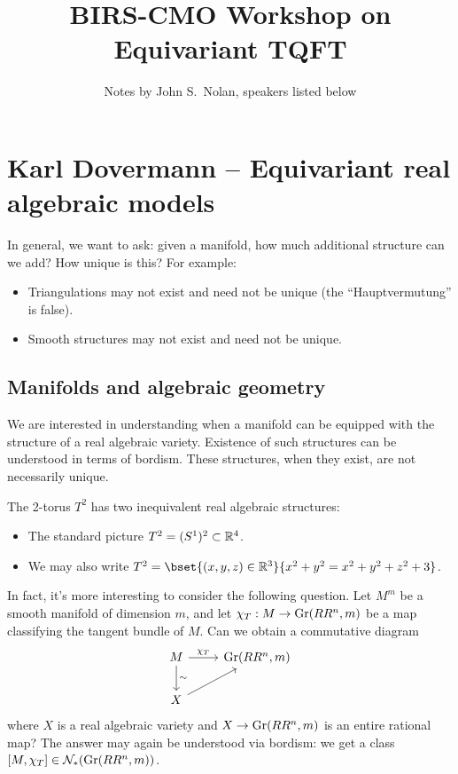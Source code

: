 \documentclass{amsart}
\title{BIRS-CMO Workshop on Equivariant TQFT}
\author{Notes by John S.\ Nolan, speakers listed below}
\begin{document}
\maketitle

\tableofcontents

\section{Karl Dovermann -- Equivariant real algebraic models}

In general, we want to ask: given a manifold, how much additional structure can we add?
How unique is this?
For example:

\begin{itemize}
  \item Triangulations may not exist and need not be unique (the ``Hauptvermutung'' is false).
  \item Smooth structures may not exist and need not be unique.
\end{itemize}

\subsection{Manifolds and algebraic geometry}

We are interested in understanding when a manifold can be equipped with the structure of a real algebraic variety.
Existence of such structures can be understood in terms of bordism.
These structures, when they exist, are not necessarily unique.

\begin{ex}
  The 2-torus $T^2$ has two inequivalent real algebraic structures:
  \begin{itemize}
    \item The standard picture $T^2 = (S^1)^2 \subset \mathbb{R}^4$.
    \item We may also write $T^2 = \bset{(x, y, z) \in \RR^3}{x^2 + y^2 = x^2 + y^2 + z^2 + 3}$.
  \end{itemize}
\end{ex}

In fact, it's more interesting to consider the following question.
Let $M^m$ be a smooth manifold of dimension $m$, and let $\chi_T: M \to \operatorname{Gr}(RR^n, m)$ be a map classifying the tangent bundle of $M$.
Can we obtain a commutative diagram
\[
  \begin{tikzcd}
    M \dar["\sim"] \rar["\chi_T"] & \Gr(RR^n, m) \\
    X \ar[ur]
  \end{tikzcd}
\]
where $X$ is a real algebraic variety and $X \to \operatorname{Gr}(RR^n, m)$ is an entire rational map?
The answer may again be understood via bordism: we get a class $[M, \chi_T] \in \mathcal{N}_*(\operatorname{Gr}(RR^n, m))$.
\end{document}
